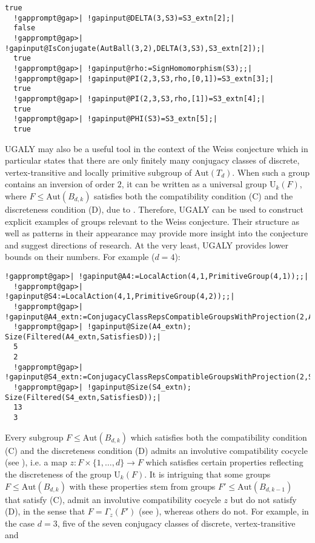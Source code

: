 \documentclass[a4paper,11pt]{report}
\begin{document}
{{\begin{Verbatim}[commandchars=!@|,fontsize=\small,frame=single,label=Example]
  true
  !gapprompt@gap>| !gapinput@DELTA(3,S3)=S3_extn[2];|
  false
  !gapprompt@gap>| !gapinput@IsConjugate(AutBall(3,2),DELTA(3,S3),S3_extn[2]);|
  true
  !gapprompt@gap>| !gapinput@rho:=SignHomomorphism(S3);;|
  !gapprompt@gap>| !gapinput@PI(2,3,S3,rho,[0,1])=S3_extn[3];|
  true
  !gapprompt@gap>| !gapinput@PI(2,3,S3,rho,[1])=S3_extn[4];|
  true
  !gapprompt@gap>| !gapinput@PHI(S3)=S3_extn[5];|
  true
\end{Verbatim}
 \textsf{UGALY} may also be a useful tool in the context of the Weiss conjecture \cite{Wei78} which in particular states that there are only finitely many conjugacy classes
of discrete, vertex-transitive and locally primitive subgroup of $\mathrm{Aut}(T_{d})$. When such a group contains an inversion of order $2$, it can be written as a universal group $\mathrm{U}_{k}(F)$, where $F\le\mathrm{Aut}(B_{d,k})$ satisfies both the compatibility condition (C) and the discreteness condition
(D), due to \cite[Corollary 4.38]{Tor20}. Therefore, \textsf{UGALY} can be used to construct explicit examples of groups relevant to the Weiss
conjecture. Their structure as well as patterns in their appearance may
provide more insight into the conjecture and suggest directions of research.
At the very least, \textsf{UGALY} provides lower bounds on their numbers. For example ($d=4$): 
\begin{Verbatim}[commandchars=!@|,fontsize=\small,frame=single,label=Example]
  !gapprompt@gap>| !gapinput@A4:=LocalAction(4,1,PrimitiveGroup(4,1));;|
  !gapprompt@gap>| !gapinput@S4:=LocalAction(4,1,PrimitiveGroup(4,2));;|
  !gapprompt@gap>| !gapinput@A4_extn:=ConjugacyClassRepsCompatibleGroupsWithProjection(2,A4);;|
  !gapprompt@gap>| !gapinput@Size(A4_extn); Size(Filtered(A4_extn,SatisfiesD));|
  5
  2
  !gapprompt@gap>| !gapinput@S4_extn:=ConjugacyClassRepsCompatibleGroupsWithProjection(2,S4);;|
  !gapprompt@gap>| !gapinput@Size(S4_extn); Size(Filtered(S4_extn,SatisfiesD));|
  13
  3
\end{Verbatim}
 Every subgroup $F\le\mathrm{Aut}(B_{d,k})$ which satisfies both the compatibility condition (C) and the discreteness
condition (D) admits an involutive compatibility cocycle (see \cite[Section 3.2.2]{Tor20}), i.e. a map $z:F\times\{1,\ldots,d\}\to F$ which satisfies certain properties reflecting the discreteness of the group $\mathrm{U}_{k}(F)$. It is intriguing that some groups $F\le\mathrm{Aut}(B_{d,k})$ with these properties stem from groups $F'\le\mathrm{Aut}(B_{d,k-1})$ that satisfy (C), admit an involutive compatibility cocycle $z$ but do not satisfy (D), in the sense that $F=\Gamma_{z}(F')$ (see \cite[Proposition 3.26]{Tor20}), whereas others do not. For example, in the case $d=3$, five of the seven conjugacy classes of discrete, vertex-transitive and
}}
\end{document}
